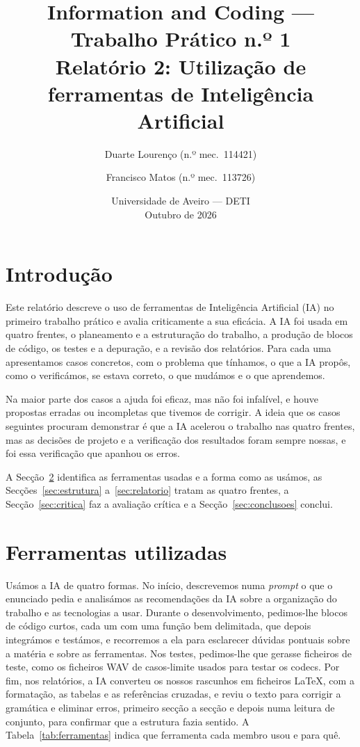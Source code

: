 \documentclass[a4paper,11pt]{article}
\title{Information and Coding --- Trabalho Prático n.º 1\\[4pt]
\large Relatório 2: Utilização de ferramentas de Inteligência Artificial}
\author{%
  Duarte Lourenço (n.º mec.~114421) \and
  Francisco Matos (n.º mec.~113726)}
\date{Universidade de Aveiro --- DETI\\ Outubro de 2026}
\begin{document}
\setlength{\droptitle}{-2.2cm}
\maketitle

\section{Introdução}
\label{sec:intro}
Este relatório descreve o uso de ferramentas de Inteligência Artificial (IA) no
primeiro trabalho prático e avalia criticamente a sua eficácia. A IA foi usada
em quatro frentes, o planeamento e a estruturação do trabalho, a produção de
blocos de código, os testes e a depuração, e a revisão dos relatórios. Para
cada uma apresentamos casos concretos, com o problema que tínhamos, o que a IA
propôs, como o verificámos, se estava correto, o que mudámos e o que
aprendemos.

Na maior parte dos casos a ajuda foi eficaz, mas não foi infalível, e houve
propostas erradas ou incompletas que tivemos de corrigir. A ideia que os casos
seguintes procuram demonstrar é que a IA acelerou o trabalho nas quatro
frentes, mas as decisões de projeto e a verificação dos resultados foram sempre
nossas, e foi essa verificação que apanhou os erros.

A Secção~\ref{sec:ferramentas}
identifica as ferramentas usadas e a forma como as usámos, as
Secções~\ref{sec:estrutura} a~\ref{sec:relatorio} tratam as quatro frentes, a
Secção~\ref{sec:critica} faz a avaliação crítica e a
Secção~\ref{sec:conclusoes} conclui.

\section{Ferramentas utilizadas}
\label{sec:ferramentas}
Usámos a IA de quatro formas. No início, descrevemos numa \emph{prompt} o que
o enunciado pedia e analisámos as recomendações da IA sobre a organização do
trabalho e as tecnologias a usar. Durante o desenvolvimento, pedimos-lhe blocos
de código curtos, cada um com uma função bem delimitada, que depois integrámos e
testámos, e recorremos a ela para esclarecer dúvidas pontuais sobre a matéria e
sobre as ferramentas. Nos testes, pedimos-lhe que gerasse ficheiros de teste,
como os ficheiros WAV de casos-limite usados para testar os codecs. Por fim,
nos relatórios, a IA converteu os nossos rascunhos em ficheiros \LaTeX{}, com a
formatação, as tabelas e as referências cruzadas, e reviu o texto para corrigir
a gramática e eliminar erros, primeiro secção a secção e depois numa leitura de
conjunto, para confirmar que a estrutura fazia sentido. A
Tabela~\ref{tab:ferramentas} indica que ferramenta cada membro usou e para quê.
\end{document}
